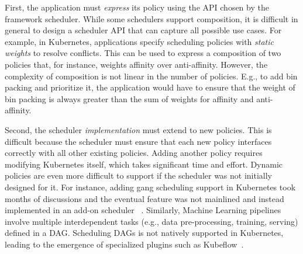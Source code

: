 First, the application must \emph{express} its policy using the API chosen by the framework scheduler.
While some schedulers support composition, it is difficult in general to design a scheduler API that can capture all possible use cases.
For example, in Kubernetes, applications specify scheduling policies with \emph{static weights} to resolve conflicts.
This can be used to express a composition of two policies that, for instance, weights affinity over anti-affinity.
However, the complexity of composition is not linear in the number of policies.
E.g., to add bin packing and prioritize it, the application would have to ensure that the weight of bin packing is always greater than the sum of weights for affinity and anti-affinity.

Second, the scheduler \emph{implementation} must extend to new policies.
This is difficult because the scheduler must ensure that each new policy interfaces correctly with all other existing policies.
Adding another policy requires modifying Kubernetes itself, which takes significant time and effort. Dynamic policies are even more difficult to support if the scheduler was not initially designed for it. For instance, adding gang scheduling support in Kubernetes took months of discussions and the eventual feature was not mainlined and instead implemented in an add-on scheduler ~\cite{kubernetes-gang-scheduling, kubernetes-gang-scheduling-first-comment, kubernetes-gang-scheduling-kubebatch-pr}.
Similarly, Machine Learning pipelines involve multiple interdependent tasks (e.g., data pre-processing, training, serving) defined in a DAG. Scheduling DAGs is not natively supported in Kubernetes, leading to the emergence of specialized plugins such as Kubeflow~\cite{kubeflow}.



